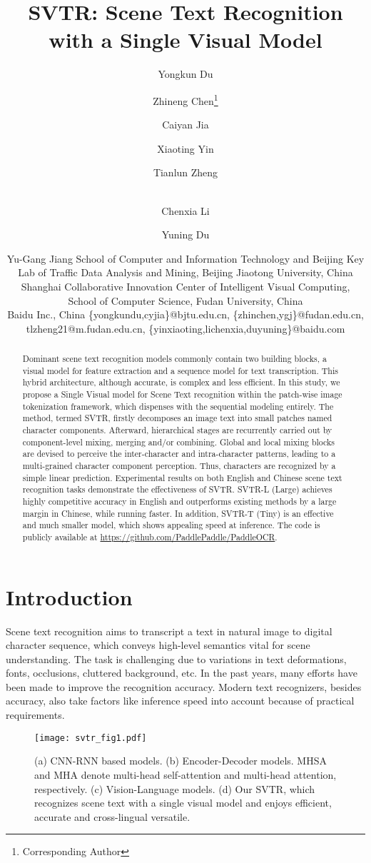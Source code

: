 \documentclass{article}
\title{SVTR: Scene Text Recognition with a Single Visual Model}
\author{
Yongkun Du\and
Zhineng Chen\footnote{Corresponding Author}\and
Caiyan Jia\and
Xiaoting Yin\and
Tianlun Zheng\and\\
Chenxia Li\and
Yuning Du\and
Yu-Gang Jiang
\affiliations
School of Computer and Information Technology and Beijing Key Lab of Traffic Data Analysis and Mining, Beijing Jiaotong University, China\\
Shanghai Collaborative Innovation Center of Intelligent Visual Computing, School of Computer Science, Fudan University, China\\
Baidu Inc., China
\emails
\{yongkundu,cyjia\}@bjtu.edu.cn,
\{zhinchen,ygj\}@fudan.edu.cn,
tlzheng21@m.fudan.edu.cn,
\{yinxiaoting,lichenxia,duyuning\}@baidu.com
}
\begin{document}
\maketitle

\begin{abstract}
Dominant scene text recognition models commonly contain two building blocks, a visual model for feature extraction and a sequence model for text transcription. This hybrid architecture, although accurate, is complex and less efficient. In this study, we propose a Single Visual model for Scene Text recognition within the patch-wise image tokenization framework, which dispenses with the sequential modeling entirely. The method, termed SVTR, firstly decomposes an image text into small patches named character components. Afterward, hierarchical stages are recurrently carried out by component-level mixing, merging and/or combining. Global and local mixing blocks are devised to perceive the inter-character and intra-character patterns, leading to a multi-grained character component perception. Thus, characters are recognized by a simple linear prediction. Experimental results on both English and Chinese scene text recognition tasks demonstrate the effectiveness of SVTR. SVTR-L (Large) achieves highly competitive accuracy in English and outperforms existing methods by a large margin in Chinese, while running faster. In addition, SVTR-T (Tiny) is an effective and much smaller model, which shows appealing speed at inference. The code is publicly available at \url{https://github.com/PaddlePaddle/PaddleOCR}.


\end{abstract}

\section{Introduction}
Scene text recognition aims to transcript a text in natural image to digital character sequence, which conveys high-level semantics vital for scene understanding. The task is challenging due to variations in text deformations, fonts, occlusions, cluttered background, etc. In the past years, many efforts have been made to improve the recognition accuracy. Modern text recognizers, besides accuracy, also take factors like inference speed into account because of practical requirements.

\begin{figure}[ht] 
\centering
\texttt{[image: svtr\_fig1.pdf]}  
\caption{(a) CNN-RNN based models. (b) Encoder-Decoder models. MHSA and MHA denote multi-head self-attention and multi-head attention, respectively. (c) Vision-Language models. (d) Our SVTR, which recognizes scene text with a single visual model and enjoys efficient, accurate and cross-lingual versatile.}  
\label{fig:1}  
\end{figure}
\end{document}
